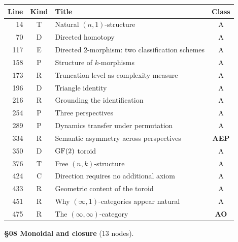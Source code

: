 \begin{center}
\scriptsize
\begin{tabular}{r|c|l|c}
\textbf{Line} & \textbf{Kind} & \textbf{Title} & \textbf{Class} \\
\hline
14 & \textsf{T} & Natural $(n,1)$-structure & A \\
70 & \textsf{D} & Directed homotopy & A \\
117 & \textsf{E} & Directed 2-morphism: two classification schemes & A \\
158 & \textsf{P} & Structure of $k$-morphisms & A \\
173 & \textsf{R} & Truncation level as complexity measure & A \\
196 & \textsf{D} & Triangle identity & A \\
216 & \textsf{R} & Grounding the identification & A \\
254 & \textsf{P} & Three perspectives & A \\
289 & \textsf{P} & Dynamics transfer under permutation & A \\
334 & \textsf{R} & Semantic asymmetry across perspectives & \textbf{AEP} \\
350 & \textsf{D} & $\operatorname{GF}(2)$ toroid & A \\
376 & \textsf{T} & Free $(n,k)$-structure & A \\
424 & \textsf{C} & Direction requires no additional axiom & A \\
433 & \textsf{R} & Geometric content of the toroid & A \\
451 & \textsf{R} & Why $(\infty,1)$-categories appear natural & A \\
475 & \textsf{R} & The $(\infty,\infty)$-category & \textbf{AO} \\
\end{tabular}
\end{center}

\medskip
\noindent\textbf{\S08 Monoidal and closure} (13 nodes).

